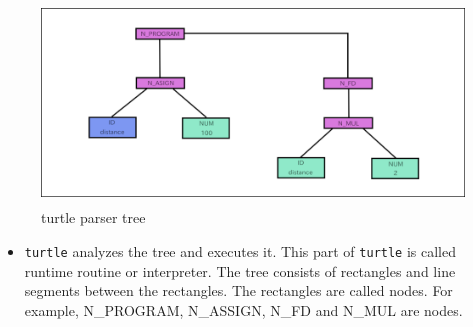 \begin{figure}
\centering
\includegraphics[width=12cm,height=5.34cm]{../image/turtle_parser_tree.png}
\caption{turtle parser tree}
\end{figure}

\begin{itemize}
\tightlist
\item
  \passthrough{\lstinline!turtle!} analyzes the tree and executes it.
  This part of \passthrough{\lstinline!turtle!} is called runtime
  routine or interpreter. The tree consists of rectangles and line
  segments between the rectangles. The rectangles are called nodes. For
  example, N\_PROGRAM, N\_ASSIGN, N\_FD and N\_MUL are nodes.


\end{itemize}
